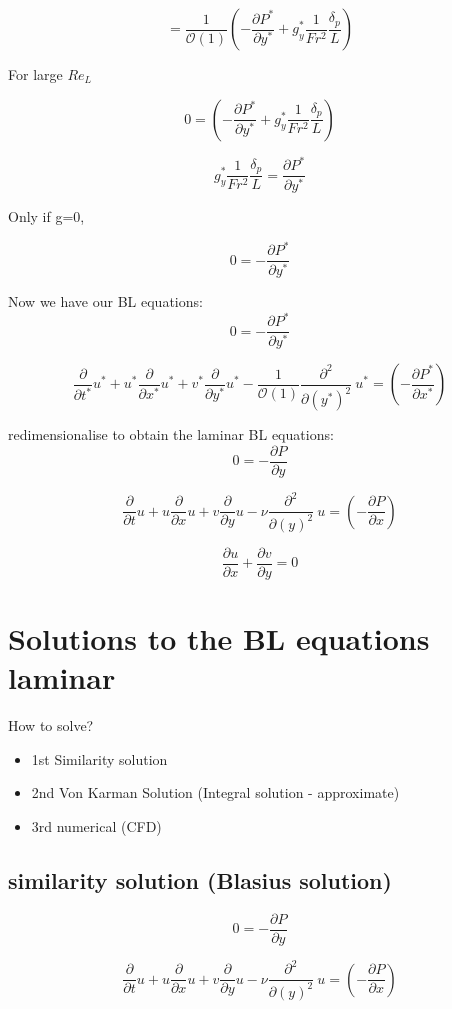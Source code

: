 \documentclass[11pt]{article}
\begin{document}
$$ =  \frac{1}{\mathcal{O}(1)} (-\frac{\partial P^*}{\partial y^*} +g_y^*\frac{1}{Fr^2}\frac{\delta_p}{L})$$

For large $Re_L$

$$0 =  (-\frac{\partial P^*}{\partial y^*} +g_y^*\frac{1}{Fr^2}\frac{\delta_p}{L})$$

$$g_y^*\frac{1}{Fr^2}\frac{\delta_p}{L} =  \frac{\partial P^*}{\partial y^*} $$

Only if g=0,

$$0 = - \frac{\partial P^*}{\partial y^*} $$

Now we have our BL equations:
$$0 = - \frac{\partial P^*}{\partial y^*} $$


$$\frac{\partial }{\partial t^*} u^* + u^*  \frac{\partial}{\partial x^* } u^* + v^*  \frac{\partial}{\partial y^*} u^* - \frac{1}{\mathcal{O}(1)} \frac{\partial^2}{\partial (y^*)^2} \ u^*  =  ( -  \frac{\partial P^*}{\partial x^*} )$$

redimensionalise to obtain the laminar BL equations:
$$0 = - \frac{\partial P}{\partial y} $$

$$\frac{\partial }{\partial t} u + u  \frac{\partial}{\partial x } u + v  \frac{\partial}{\partial y} u -  \nu  \frac{\partial^2}{\partial (y)^2} \ u  =  ( -  \frac{\partial P}{\partial x} )$$

$$\frac{\partial u}{\partial x} + \frac{\partial v}{\partial y} = 0$$

\section{Solutions to the BL equations laminar}
How to solve?
\begin{itemize}
\item 1st Similarity solution
\item 2nd Von Karman Solution (Integral solution - approximate)
\item 3rd numerical (CFD)
\end{itemize}

\subsection{similarity solution (Blasius solution)}
$$0 = - \frac{\partial P}{\partial y} $$

$$\frac{\partial }{\partial t} u + u  \frac{\partial}{\partial x } u + v  \frac{\partial}{\partial y} u -  \nu  \frac{\partial^2}{\partial (y)^2} \ u  =  ( -  \frac{\partial P}{\partial x} )$$
\end{document}
